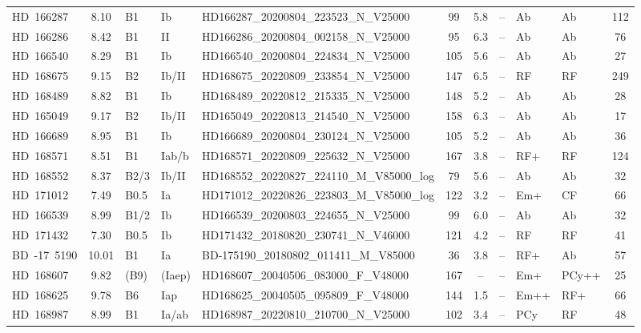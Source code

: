 {\begin{landscape}
\begin{longtable}{lclllcclllc}
\noalign{\smallskip}
HD~166287 & 8.10 & B1 & Ib & HD166287\_20200804\_223523\_N\_V25000 & 99 & 5.8 & -- & Ab & Ab & 112 \\
\noalign{\smallskip}
HD~166286 & 8.42 & B1 & II & HD166286\_20200804\_002158\_N\_V25000 & 95 & 6.3 & -- & Ab & Ab & 76 \\
\noalign{\smallskip}
HD~166540 & 8.29 & B1 & Ib & HD166540\_20200804\_224834\_N\_V25000 & 105 & 5.6 & -- & Ab & Ab & 27 \\
\noalign{\smallskip}
HD~168675 & 9.15 & B2 & Ib/II & HD168675\_20220809\_233854\_N\_V25000 & 147 & 6.5 & -- & RF & RF & 249 \\
\noalign{\smallskip}
HD~168489 & 8.82 & B1 & Ib & HD168489\_20220812\_215335\_N\_V25000 & 148 & 5.2 & -- & Ab & Ab & 28 \\
\noalign{\smallskip}
HD~165049 & 9.17 & B2 & Ib/II & HD165049\_20220813\_214540\_N\_V25000 & 158 & 6.3 & -- & Ab & Ab & 17 \\
\noalign{\smallskip}
HD~166689 & 8.95 & B1 & Ib & HD166689\_20200804\_230124\_N\_V25000 & 105 & 5.2 & -- & Ab & Ab & 36 \\
\noalign{\smallskip}
HD~168571 & 8.51 & B1 & Iab/b & HD168571\_20220809\_225632\_N\_V25000 & 167 & 3.8 & -- & RF+ & RF & 124 \\
\noalign{\smallskip}
HD~168552 & 8.37 & B2/3 & Ib/II & HD168552\_20220827\_224110\_M\_V85000\_log & 79 & 5.6 & -- & Ab & Ab & 32 \\
\noalign{\smallskip}
HD~171012 & 7.49 & B0.5 & Ia & HD171012\_20220826\_223803\_M\_V85000\_log & 122 & 3.2 & -- & Em+ & CF & 66 \\
\noalign{\smallskip}
HD~166539 & 8.99 & B1/2 & Ib & HD166539\_20200803\_224655\_N\_V25000 & 99 & 6.0 & -- & Ab & Ab & 32 \\
\noalign{\smallskip}
HD~171432 & 7.30 & B0.5 & Ib & HD171432\_20180820\_230741\_N\_V46000 & 121 & 4.2 & -- & RF & RF & 41 \\
\noalign{\smallskip}
BD~-17~5190 & 10.01 & B1 & Ia & BD-175190\_20180802\_011411\_M\_V85000 & 36 & 3.8 & -- & RF+ & Ab & 57 \\
\noalign{\smallskip}
HD~168607 & 9.82 & (B9) & (Iaep) & HD168607\_20040506\_083000\_F\_V48000 & 167 & -- & -- & Em+ & PCy++ & 25 \\
\noalign{\smallskip}
HD~168625 & 9.78 & B6 & Iap & HD168625\_20040505\_095809\_F\_V48000 & 144 & 1.5 & -- & Em++ & RF+ & 66 \\
\noalign{\smallskip}
HD~168987 & 8.99 & B1 & Ia/ab & HD168987\_20220810\_210700\_N\_V25000 & 102 & 3.4 & -- & PCy & RF & 48 \\

\end{longtable}
\end{landscape}}
